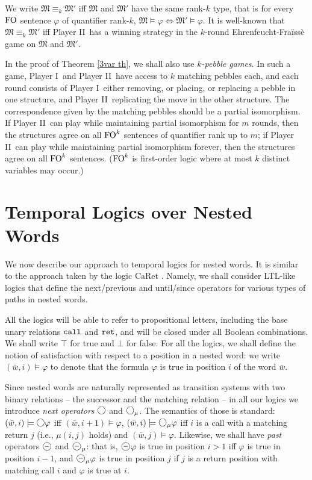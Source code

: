 \documentclass{LMCS}
\newcommand{\dupl}{Player II}
\newcommand{\spoiler}{Player I}
\newcommand{\M}{{\mu}}
\newcommand{\w}{{\bar{w}}}
\newcommand{\dm}{\Diamond}
\newcommand{\MM}{\mathfrak{M}}
\newcommand{\next}{\text{\raisebox{1pt}{$\bigcirc$}}}
\newcommand{\FO}{{\rm FO}}
\renewcommand{\phi}{\varphi}
\theoremstyle{plain}
\theoremstyle{definition}
\newcommand{\prev}{{\text{\Large $\mathbf{\circleddash}$}}}
\newcommand{\caret}{\text{CaRet}}
\newcommand{\retr}{\mathit{ret}}
\newcommand{\rett}{{\tt ret}}
\newcommand{\call}{{\tt call}}
\renewcommand{\retr}{\rett}
\newcommand{\dmm}{\dm_{\M}}
\newcommand{\dmminus}{\dm^-}
\newcommand{\dmmminus}{\dm_{\M}^-}
\renewcommand{\dm}{\next}
\renewcommand{\dmminus}{\prev}
\renewcommand{\dmm}{\dm_\M}
\renewcommand{\dmmminus}{\dmminus_{\M}}
\begin{document}
We write $\MM \equiv_k \MM'$ iff $\MM$ and $\MM'$ have the same
rank-$k$ type, that is for every $\FO$ sentence $\phi$ of quantifier
rank-$k$, $\MM \models \phi \Leftrightarrow \MM' \models \phi$. 
It is well-known that $\MM \equiv_k \MM'$ iff \dupl\ has a
winning strategy in the $k$-round Ehrenfeucht-Fra\"iss\`e game on
$\MM$ and $\MM'$. 

In the proof of Theorem \ref{3var th}, we shall also use {\em
  $k$-pebble games}. In such a game, \spoiler\ and \dupl\ have access
  to
 $k$ matching pebbles each, and each round consists of \spoiler\ 
  either removing, or placing, or replacing a pebble in one structure,
  and \dupl\ replicating the move in the other structure. The
  correspondence given by the matching pebbles should be a partial
  isomorphism. If \dupl\ can play while maintaining partial
  isomorphism for $m$ rounds, then the structures agree on all $\FO^k$
  sentences of quantifier rank up to $m$; if \dupl\ can play while
  maintaining partial
  isomorphism forever, then the structures agree on all $\FO^k$
  sentences.  ($\FO^k$ is first-order logic where at most $k$
  distinct variables may occur.)


\section{Temporal Logics over Nested Words}
\label{tl-sec}

\noindent We now describe our approach to temporal logics for nested words. It
is similar to the approach taken by the logic
$\caret$ \cite{AEM04}. Namely, we shall consider LTL-like
logics that define the next/previous and until/since operators for
various types of paths in nested words.

All the logics will be able to refer to propositional letters,
including the base unary relations $\call$ and $\retr$,
and will be closed under all Boolean  combinations. We shall write $\top$
for true and $\bot$ for false. For all the logics, we shall define the
notion of satisfaction with respect to a position in a nested word: we
write $(\w,i)\models\phi$ to denote that the formula $\phi$ is true in 
position $i$ of the word $\w$.

Since nested words are naturally represented as transition
systems with two binary relations -- the successor and the matching
relation -- in all our logics we introduce {\em next operators} $\dm$
and $\dmm$. The semantics of those is standard: $(\w,i)\models\dm
\phi$ iff $(\w,i+1)\models\phi$, 
$(\w,i)\models\dmm\phi$
iff $i$ is a call with a matching return $j$ (i.e., $\M(i,j)$ holds)
and $(\w,j)\models\phi$.
Likewise, we shall have {\em past} operators $\dmminus$ and $\dmmminus$:
that is,  $\dmminus \phi$ is true in position
$i>1$ iff $\phi$ is true in position $i-1$, and $\dmmminus\phi$ is true
in position $j$ 
if $j$ is a return position with matching call $i$ and $\phi$ is true at  $i$.
\end{document}
